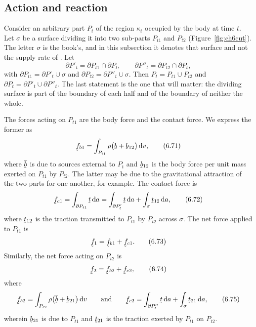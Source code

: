 \subsection{Action and reaction}\label{sec:ch6action}

Consider an arbitrary part $P_{t}$ of the region $\kappa_{t}$ occupied
by the body at time $t$. Let $\sigma$ be a surface dividing it into two
sub-parts $P_{t1}$ and $P_{t2}$ (Figure~\ref{fig:ch6cut}). The letter
$\sigma$ is the book's, and in this subsection it denotes that surface
and not the supply rate of . Let
\[
   \partial P'_{t}=\partial P_{t1}\cap\partial P_{t},\qquad
   \partial P''_{t}=\partial P_{t2}\cap\partial P_{t},
\]
with $\partial P_{t1}=\partial P'_{t}\cup\sigma$ and
$\partial P_{t2}=\partial P''_{t}\cup\sigma$. Then
$P_{t}=P_{t1}\cup P_{t2}$ and
$\partial P_{t}=\partial P'_{t}\cup\partial P''_{t}$. The last
statement is the one that will matter: the dividing surface is part of
the boundary of each half and of the boundary of neither the whole.

The forces acting on $P_{t1}$ are the body force and the contact force.
We express the former as
\begin{equation}
   \vek{f}_{b1}=\int_{P_{t1}}\rho\big(\bar{\bb}+\bb_{12}\big)\,\dl v ,
   \tag{6.71}\label{eq:6.71}
\end{equation}
where $\bar{\bb}$ is due to sources external to $P_{t}$ and
$\bb_{12}$ is the body force per unit mass exerted on $P_{t1}$ by
$P_{t2}$. The latter may be due to the gravitational attraction of the
two parts for one another, for example. The contact force is
\begin{equation}
   \vek{f}_{c1}=\int_{\partial P_{t1}}\bt\,\dl a
   =\int_{\partial P'_{t}}\bt\,\dl a+\int_{\sigma}\bt_{12}\,\dl a ,
   \tag{6.72}\label{eq:6.72}
\end{equation}
where $\bt_{12}$ is the traction transmitted to $P_{t1}$ by $P_{t2}$
across $\sigma$. The net force applied to $P_{t1}$ is
\begin{equation}
   \vek{f}_{1}=\vek{f}_{b1}+\vek{f}_{c1}.
   \tag{6.73}\label{eq:6.73}
\end{equation}
Similarly, the net force acting on $P_{t2}$ is
\begin{equation}
   \vek{f}_{2}=\vek{f}_{b2}+\vek{f}_{c2},
   \tag{6.74}\label{eq:6.74}
\end{equation}
where
\begin{equation}
   \vek{f}_{b2}=\int_{P_{t2}}\rho\big(\bar{\bb}+\bb_{21}\big)\,\dl v
   \qquad\text{and}\qquad
   \vek{f}_{c2}=\int_{\partial P''_{t}}\bt\,\dl a
   +\int_{\sigma}\bt_{21}\,\dl a ,
   \tag{6.75}\label{eq:6.75}
\end{equation}
wherein $\bb_{21}$ is due to $P_{t1}$ and $\bt_{21}$ is the traction
exerted by $P_{t1}$ on $P_{t2}$.

